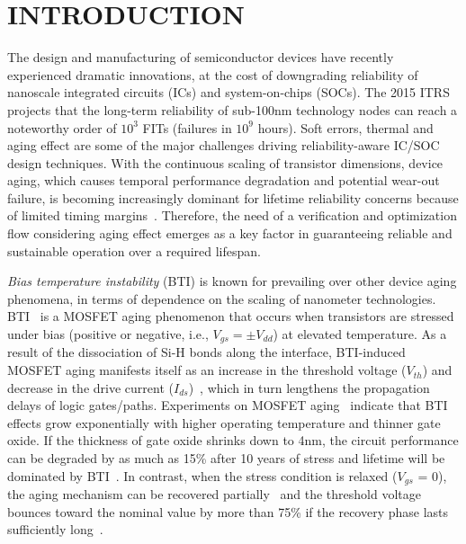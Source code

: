 \section{INTRODUCTION}
The design and manufacturing of semiconductor devices have recently experienced dramatic innovations, at the cost of downgrading reliability of nanoscale integrated circuits (ICs) and system-on-chips (SOCs). The 2015 ITRS~\cite{itrs2015} projects that the long-term reliability of sub-100nm technology nodes can reach a noteworthy order of $10^3$ FITs (failures in $10^9$ hours). Soft errors, thermal and aging effect are some of the major challenges driving reliability-aware IC/SOC design techniques. With the continuous scaling of transistor dimensions, device aging, which causes temporal performance degradation and potential wear-out failure, is becoming increasingly dominant for lifetime reliability concerns because of limited timing margins~\cite{mcpherson2006reliability}. Therefore, the need of a verification and optimization flow considering aging effect emerges as a key factor in guaranteeing reliable and sustainable operation over a required lifespan.

\textit{Bias temperature instability} (BTI) is known for prevailing over other device aging phenomena, in terms of dependence on the scaling of nanometer technologies. BTI~\cite{schroder2003negative} is a MOSFET aging phenomenon that occurs when transistors are stressed under bias (positive or negative, i.e., $V_{gs} = \pm V_{dd}$) at elevated temperature. As a result of the dissociation of Si-H bonds along the  interface, BTI-induced MOSFET aging manifests itself as an increase in the threshold voltage ($V_{th}$) and decrease in the drive current ($I_{ds}$)~\cite{stathis2006negative}, which in turn lengthens the propagation delays of logic gates/paths. Experiments on MOSFET aging~\cite{chakravarthi2004comprehensive} indicate that BTI effects grow exponentially with higher operating temperature and thinner gate oxide. If the thickness of gate oxide shrinks down to 4nm, the circuit performance can be degraded by as much as 15\% after 10 years of stress and lifetime will be dominated by BTI~\cite{kimizuka1999impact}. In contrast, when the stress condition is relaxed ($V_{gs}$ = 0), the aging mechanism can be recovered partially~\cite{kumar2006analytical} and the threshold voltage bounces toward the nominal value by more than 75\% if the recovery phase lasts sufficiently long~\cite{wang2010impact}.

